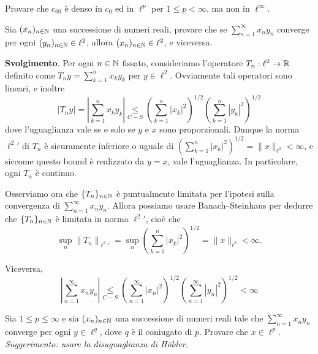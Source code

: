 \begin{exercise}
\label{ex:c00_density}
	Provare che $c_{00}$ è denso in $c_0$ ed in $\ell^p$ per $1 \leq p < \infty$, ma non in $\ell^\infty$.
\end{exercise}
\begin{exercise}
	Sia $(x_n)_{n \in \mathbb{N}}$ una successione di numeri reali, provare che se $\sum_{n=1}^\infty x_n y_n$ converge per ogni $(y_n)_{n \in \mathbb{N}} \in \ell^2$, allora $(x_n)_{n \in \mathbb{N}} \in \ell^2$, e viceversa.

	\textbf{Svolgimento}. Per ogni $n \in \mathbb{N}$ fissato, consideriamo l'operatore $T_n : \ell^2 \to \mathbb{R}$ definito come $T_ny = \sum_{k=1}^n x_ky_k$ per $y \in \ell^2$. Ovviamente tali operatori sono lineari, e inoltre
	\begin{equation*}
		|T_ny| = \left| \sum_{k=1}^n x_k y_k \right| \underset{C-S}\leq \left( \sum_{k=1}^n |x_k|^2\right)^{1/2}\! \left( \sum_{k=1}^n |y_k|^2 \right)^{1/2}
	\end{equation*}
	dove l'uguaglianza vale se e solo se $y$ e $x$ sono proporzionali. Dunque la norma ${\ell^2}'$ di $T_n$ è sicuramente inferiore o uguale di $\left( \sum_{k=1}^n |x_k|^2\right)^{1/2} = \|x\|_{\ell^2} < \infty$, e siccome questo bound è realizzato da $y=x$, vale l'uguaglianza.
	In particolare, ogni $T_n$ è continuo.

	Osserviamo ora che $\{T_n\}_{n \in \mathbb{N}}$ è puntualmente limitata per l'ipotesi sulla convergenza di $\sum_{n=1}^\infty x_n y_n$. Allora possiamo usare Banach--Steinhaus per dedurre che $\{T_n\}_{n \in \mathbb{N}}$ è limitata in norma ${\ell^2}'$, cioè che
	\begin{equation*}
		\sup_n \|T_n\|_{{\ell^2}'} = \sup_n \left( \sum_{k=1}^n |x_k|^2 \right)^{1/2} = \|x\|_{\ell^2} < \infty.
	\end{equation*}

	Viceversa,
	\begin{equation*}
		\left| \sum_{n=1}^\infty x_n y_n \right| \underset{C-S}\leq \left( \sum_{n=1}^\infty |x_n|^2\right)^{1/2}\! \left( \sum_{n=1}^\infty |y_n|^2 \right)^{1/2} < \infty
	\end{equation*}
\end{exercise}

\begin{exercise}
	Sia $1 \leq p \leq \infty$ e sia $(x_n)_{n \in \mathbb{N}}$ una successione di numeri reali tale che $\sum_{n=1}^\infty x_ny_n$ converge per ogni $y \in \ell^q$, dove $q$ è il coniugato di $p$. Provare che $x \in \ell^p$. \emph{Suggerimento: usare la disuguaglianza di H\"older.}
\end{exercise}

